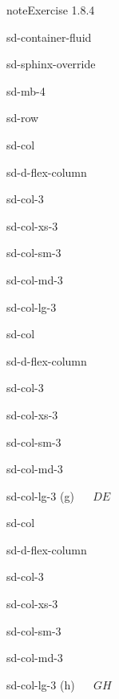 \documentclass[letterpaper,10pt,english]{jupyterBook}
\begin{document}
\begin{sphinxadmonition}{note}{Exercise 1.8.4}
\begin{sphinxuseclass}{sd-container-fluid}
\begin{sphinxuseclass}{sd-sphinx-override}
\begin{sphinxuseclass}{sd-mb-4}
\begin{sphinxuseclass}{sd-row}
\begin{sphinxuseclass}{sd-col}
\begin{sphinxuseclass}{sd-d-flex-column}
\begin{sphinxuseclass}{sd-col-3}
\begin{sphinxuseclass}{sd-col-xs-3}
\begin{sphinxuseclass}{sd-col-sm-3}
\begin{sphinxuseclass}{sd-col-md-3}
\begin{sphinxuseclass}{sd-col-lg-3}
\end{sphinxuseclass}
\end{sphinxuseclass}
\end{sphinxuseclass}
\end{sphinxuseclass}
\end{sphinxuseclass}
\end{sphinxuseclass}
\end{sphinxuseclass}
\begin{sphinxuseclass}{sd-col}
\begin{sphinxuseclass}{sd-d-flex-column}
\begin{sphinxuseclass}{sd-col-3}
\begin{sphinxuseclass}{sd-col-xs-3}
\begin{sphinxuseclass}{sd-col-sm-3}
\begin{sphinxuseclass}{sd-col-md-3}
\begin{sphinxuseclass}{sd-col-lg-3}
\sphinxAtStartPar
(g)    \(DE\)

\end{sphinxuseclass}
\end{sphinxuseclass}
\end{sphinxuseclass}
\end{sphinxuseclass}
\end{sphinxuseclass}
\end{sphinxuseclass}
\end{sphinxuseclass}
\begin{sphinxuseclass}{sd-col}
\begin{sphinxuseclass}{sd-d-flex-column}
\begin{sphinxuseclass}{sd-col-3}
\begin{sphinxuseclass}{sd-col-xs-3}
\begin{sphinxuseclass}{sd-col-sm-3}
\begin{sphinxuseclass}{sd-col-md-3}
\begin{sphinxuseclass}{sd-col-lg-3}
\sphinxAtStartPar
(h)    \(GH\)


\end{sphinxuseclass}
\end{sphinxuseclass}
\end{sphinxuseclass}
\end{sphinxuseclass}
\end{sphinxuseclass}
\end{sphinxuseclass}
\end{sphinxuseclass}
\end{sphinxuseclass}
\end{sphinxuseclass}
\end{sphinxuseclass}
\end{sphinxuseclass}
\end{sphinxadmonition}
\end{document}
